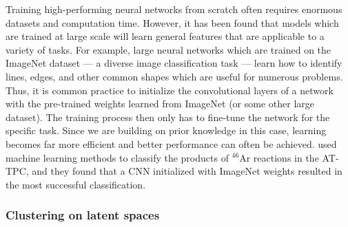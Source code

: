 \documentclass[review,number,sort&compress]{elsarticle}
\begin{document}


Training high-performing neural networks from scratch often requires enormous datasets and computation time. However, it has been found that models which are trained at large scale will learn general features that are applicable to a variety of tasks. For example, large neural networks which are trained on the ImageNet dataset \cite{Russakovsky2015} --- a diverse image classification task --- learn how to identify lines, edges, and other common shapes which are useful for numerous problems. Thus, it is common practice to initialize the convolutional layers of a network with the pre-trained weights learned from ImageNet (or some other large dataset). The training process then only has to fine-tune the network for the specific task. Since we are building on prior knowledge in this case, learning becomes far more efficient and better performance can often be achieved. \citet{Kuchera2019} used machine learning methods to classify the products of $^{46}$Ar reactions in the AT-TPC, and they found that a CNN initialized with ImageNet weights resulted in the most successful classification.

\subsubsection{Clustering on latent spaces}

\end{document}
